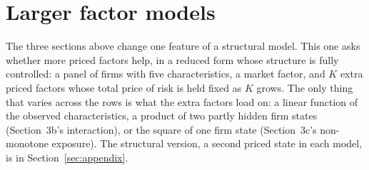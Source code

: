 \documentclass[11pt]{article}
\begin{document}
\section{Larger factor models}

The three sections above change one feature of a structural model. This one asks whether more priced factors help, in a reduced form whose structure is fully controlled: a panel of firms with five characteristics, a market factor, and $K$ extra priced factors whose total price of risk is held fixed as $K$ grows. The only thing that varies across the rows is what the extra factors load on: a linear function of the observed characteristics, a product of two partly hidden firm states (Section~3b's interaction), or the square of one firm state (Section~3c's non-monotone exposure). The structural version, a second priced state in each model, is in Section~\ref{sec:appendix}.
\end{document}

